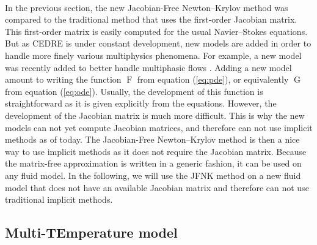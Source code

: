     \paragraph{}
    In the previous section, the new Jacobian-Free Newton--Krylov method was compared to the traditional method that uses the first-order Jacobian matrix.
    This first-order matrix is easily computed for the usual Navier--Stokes equations.
    But as CEDRE is under constant development, new models are added in order to handle more finely various multiphysics phenomena.
    For example, a new model was recently added to better handle multiphasic flows \cite{Cordesse2020}.
    Adding a new model amount to writing the function $\operatorname{F}$ from equation (\ref{eq:pde}), or equivalently $\operatorname{G}$ from equation (\ref{eq:ode}).
    Usually, the development of this function is straightforward as it is given explicitly from the equations.
    However, the development of the Jacobian matrix is much more difficult.
    This is why the new models can not yet compute Jacobian matrices, and therefore can not use implicit methods as of today.
    The Jacobian-Free Newton--Krylov method is then a nice way to use implicit methods as it does not require the Jacobian matrix.
    Because the matrix-free approximation is written in a generic fashion, it can be used on any fluid model.
    In the following, we will use the JFNK method on a new fluid model that does not have an available Jacobian matrix and therefore can not use traditional implicit methods.


    \subsection{Multi-TEmperature model}


